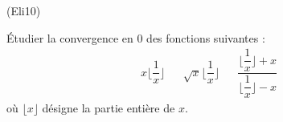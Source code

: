 \begin{tiny}(Eli10)\end{tiny}  \'Etudier la convergence en $0$ des fonctions suivantes :
\begin{align*}
 x\lfloor \dfrac{1}{x}\rfloor & & \sqrt{x}\lfloor \dfrac{1}{x}\rfloor & &
\dfrac{\lfloor \dfrac{1}{x}\rfloor + x}{\lfloor \dfrac{1}{x}\rfloor - x}
\end{align*}
où $\lfloor x \rfloor$ désigne la partie entière de $x$.